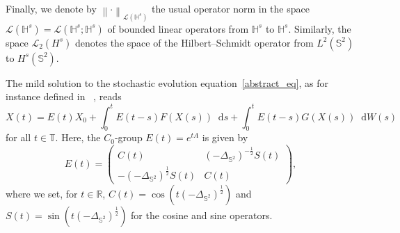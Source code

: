 \documentclass[a4paper]{amsart}
\theoremstyle{remark}
\theoremstyle{definition}
\newcommand{\R}{{\mathbb R}}
\newcommand{\HH}{\mathbb{H}}
\newcommand*\dd{\mathop{}\!\mathrm{d}}
\begin{document}
Finally, we denote by $\left\|\cdot\right\|_{\mathcal{L}(\HH^s)}$ the usual operator norm in the space $\mathcal{L}(\HH^s)=\mathcal{L}(\HH^s;\HH^s)$ of bounded linear operators from $\HH^s$ to $\HH^s$. Similarly, the space $\mathcal{L}_2(H^{s})$ denotes the space of the Hilbert--Schmidt operator from $L^2(\mathbb{S}^2)$ to $H^{s}(\mathbb{S}^2)$. 

The mild solution to the stochastic evolution equation~\eqref{abstract_eq}, as for instance defined in ~\cite{MR3236753}, reads 
\begin{equation}
\label{mild_form_comp}
X(t)=E(t)X_0+\int_{0}^{t}E(t-s)F(X(s))\dd s+\int_{0}^{t}E(t-s) G(X(s))\dd W(s)
\end{equation}
for all $t\in \mathbb{T}$. Here, the $C_0$-group $E(t)=e^{tA}$ is given by 
$$
E(t)=
\begin{pmatrix}C(t) & \left(-\Delta_{\mathbb{S}^2}\right)^{-\frac{1}{2}}S(t)\\
-\left(-\Delta_{\mathbb{S}^2}\right)^{\frac{1}{2}}S(t) & C(t)
\end{pmatrix},
$$ 
where we set, for $t \in \R$, $C(t)=\cos\left(t\left(-\Delta_{\mathbb{S}^2}\right)^{\frac{1}{2}}\right)$ and 
$S(t)=\sin\left(t\left(-\Delta_{\mathbb{S}^2}\right)^{\frac{1}{2}}\right)$ for the cosine and sine operators. 
\end{document}
